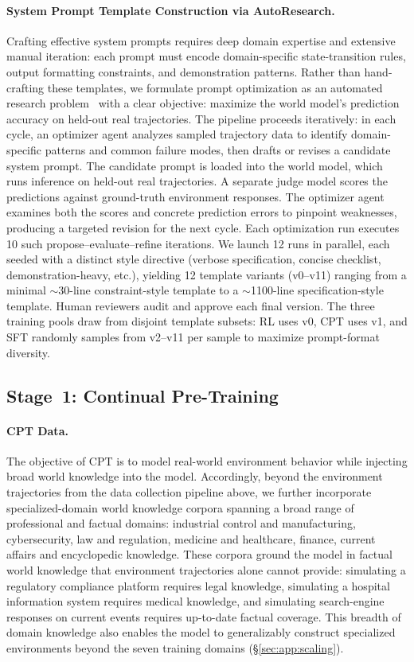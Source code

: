 \paragraph{System Prompt Template Construction via AutoResearch.}
Crafting effective system prompts requires deep domain expertise and extensive manual iteration: each prompt must encode domain-specific state-transition rules, output formatting constraints, and demonstration patterns.
Rather than hand-crafting these templates, we formulate prompt optimization as an automated research problem~\citep{karpathy2026autoresearch} with a clear objective: maximize the world model's prediction accuracy on held-out real trajectories.
The pipeline proceeds iteratively: in each cycle, an optimizer agent analyzes sampled trajectory data to identify domain-specific patterns and common failure modes, then drafts or revises a candidate system prompt.
The candidate prompt is loaded into the world model, which runs inference on held-out real trajectories. A separate judge model scores the predictions against ground-truth environment responses.
The optimizer agent examines both the scores and concrete prediction errors to pinpoint weaknesses, producing a targeted revision for the next cycle.
Each optimization run executes 10 such propose--evaluate--refine iterations.
We launch 12 runs in parallel, each seeded with a distinct style directive (verbose specification, concise checklist, demonstration-heavy, etc.), yielding 12 template variants (v0--v11) ranging from a minimal $\sim$30-line constraint-style template to a $\sim$1100-line specification-style template.
Human reviewers audit and approve each final version.
The three training pools draw from disjoint template subsets: RL uses v0, CPT uses v1, and SFT randomly samples from v2--v11 per sample to maximize prompt-format diversity.


\subsection{Stage~1: Continual Pre-Training}
\label{sec:pipeline:cpt}

\paragraph{CPT Data.}
The objective of CPT is to model real-world environment behavior while injecting broad world knowledge into the model.
Accordingly, beyond the environment trajectories from the data collection pipeline above, we further incorporate specialized-domain world knowledge corpora spanning a broad range of professional and factual domains: industrial control and manufacturing, cybersecurity, law and regulation, medicine and healthcare, finance, current affairs and encyclopedic knowledge.
These corpora ground the model in factual world knowledge that environment trajectories alone cannot provide: simulating a regulatory compliance platform requires legal knowledge, simulating a hospital information system requires medical knowledge, and simulating search-engine responses on current events requires up-to-date factual coverage.
This breadth of domain knowledge also enables the model to generalizably construct specialized environments beyond the seven training domains (\S\ref{sec:app:scaling}).

